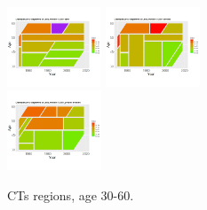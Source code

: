 \documentclass[fleqn,10pt]{wlscirep}
\begin{document}
\begin{figure}[H]
{\includegraphics[width=0.25\textwidth]{xgbm.jpeg}}
{\includegraphics[width=0.25\textwidth]{xgbm_b.jpeg}}\\
{\includegraphics[width=0.25\textwidth]{xgbm_preproc_b.jpeg}}\\
\caption{CTs regions, age 30-60.}
\label{fig:CT}
\end{figure}
%
\end{document}
